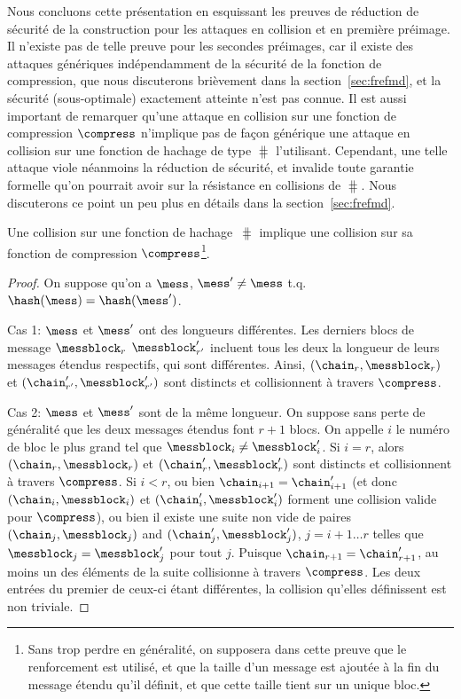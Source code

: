 Nous concluons cette présentation en esquissant les preuves de réduction de sécurité de la construction \merkdam pour les attaques en collision
et en première préimage. Il n'existe pas de telle preuve pour les secondes préimages, car il existe des attaques génériques indépendamment
de la sécurité de la fonction de compression, que nous discuterons brièvement dans la section~\ref{sec:frefmd}, et la sécurité (sous-optimale) exactement
atteinte n'est pas connue.
Il est aussi important de remarquer qu'une attaque en collision sur une fonction de compression $\compress$ n'implique pas de façon
générique une attaque en collision sur
une fonction de hachage de type \merkdam $\hash$ l'utilisant. Cependant, une telle attaque viole néanmoins la réduction de sécurité, et invalide toute garantie
formelle qu'on pourrait avoir sur la résistance en collisions de $\hash$. Nous discuterons ce point un peu plus en détails dans la section~\ref{sec:frefmd}.

\begin{prop}
Une collision sur une fonction de hachage \merkdam $\hash$ implique une collision sur sa fonction de compression
$\compress$\footnote{Sans trop perdre en généralité, on supposera dans cette preuve que le renforcement \merkdam est utilisé, et que la taille
d'un message est ajoutée à la fin du message étendu qu'il définit, et que cette taille tient sur un unique bloc.}.
\end{prop}
\begin{proof}
On suppose qu'on a
$\mess$, $\mess' \neq \mess$ t.q. $\hash(\mess) = \hash(\mess')$.

Cas 1: $\mess$ et $\mess'$ ont des longueurs différentes.
Les derniers blocs de message $\messblock_r$
$\messblock'_{r'}$ incluent tous les deux la longueur de leurs messages étendus respectifs, qui sont différentes.
Ainsi,
$(\chain_r,\messblock_r)$ et $(\chain'_{r'}, \messblock'_{r'})$ sont distincts et collisionnent à travers $\compress$.

Cas 2: $\mess$ et $\mess'$
sont de la même longueur.
On suppose sans perte de généralité que les deux messages étendus font
$r + 1$ blocs.
On appelle $i$ le numéro de bloc le plus grand tel que
$\messblock_{i} \neq \messblock'_{i}$.
Si 
$i = r$, alors $(\chain_r,\messblock_r)$ et $(\chain'_{r}, \messblock'_{r})$
sont distincts et collisionnent à travers
$\compress$.
Si
$i < r$, ou bien $\chain_{i+1} = \chain'_{i+1}$ (et donc $(\chain_i,\messblock_i)$ et $(\chain'_{i}, \messblock'_{i})$
forment une collision valide  pour $\compress$), ou bien il existe une suite non vide de paires $(\chain_j, \messblock_j)$ and $(\chain'_j, \messblock'_j)$,
$j = i+1\ldots r$ telles que $\messblock_j = \messblock'_j$ pour tout $j$.
Puisque $\chain_{r+1} = \chain'_{r+1}$, au moins un des éléments de la suite collisionne à travers
$\compress$. Les deux entrées du premier de ceux-ci étant différentes, la collision qu'elles définissent est non triviale.
\end{proof}

